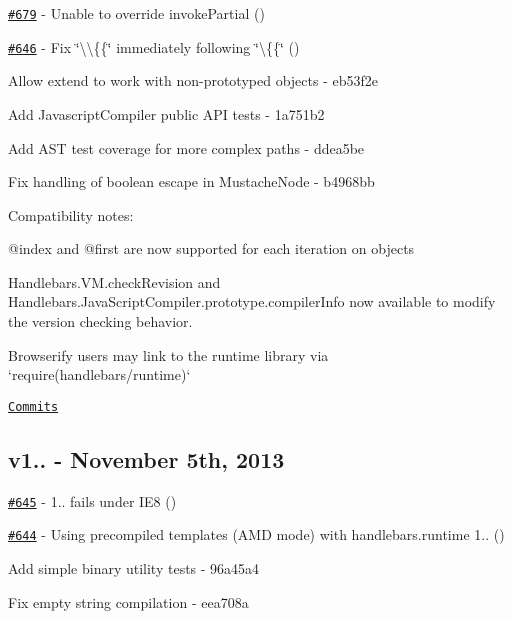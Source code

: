 \begin{DoxyItemize}
\item \href{https://github.com/wycats/handlebars.js/issues/679}{\tt \#679} -\/ Unable to override invoke\+Partial (\href{https://api.github.com/users/mattbrailsford}{\tt })
\item \href{https://github.com/wycats/handlebars.js/pull/646}{\tt \#646} -\/ Fix \char`\"{}\textbackslash{}\textbackslash{}\{\{\char`\"{} immediately following \char`\"{}\textbackslash{}\{\{\char`\"{} (\href{https://api.github.com/users/dmarcotte}{\tt })
\item Allow extend to work with non-\/prototyped objects -\/ eb53f2e
\item Add Javascript\+Compiler public A\+P\+I tests -\/ 1a751b2
\item Add A\+S\+T test coverage for more complex paths -\/ ddea5be
\item Fix handling of boolean escape in Mustache\+Node -\/ b4968bb
\end{DoxyItemize}

Compatibility notes\+:
\begin{DoxyItemize}
\item {\ttfamily @index} and {\ttfamily @first} are now supported for {\ttfamily each} iteration on objects
\item {\ttfamily Handlebars.\+V\+M.\+check\+Revision} and {\ttfamily Handlebars.\+Java\+Script\+Compiler.\+prototype.\+compiler\+Info} now available to modify the version checking behavior.
\item Browserify users may link to the runtime library via `require(\textquotesingle{}handlebars/runtime\textquotesingle{})`
\end{DoxyItemize}

\href{https://github.com/wycats/handlebars.js/compare/v1.1.2...v1.2.0}{\tt Commits}

\subsection*{v1.. -\/ November 5th, 2013}


\begin{DoxyItemize}
\item \href{https://github.com/wycats/handlebars.js/issues/645}{\tt \#645} -\/ 1.. fails under I\+E8 (\href{https://api.github.com/users/kpdecker}{\tt })
\item \href{https://github.com/wycats/handlebars.js/issues/644}{\tt \#644} -\/ Using precompiled templates (A\+M\+D mode) with handlebars.\+runtime 1.. (\href{https://api.github.com/users/fddima}{\tt })
\item Add simple binary utility tests -\/ 96a45a4
\item Fix empty string compilation -\/ eea708a
\end{DoxyItemize}

